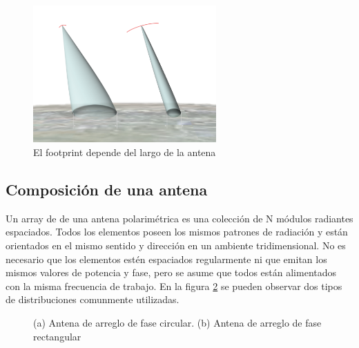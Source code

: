 \begin{figure}[H]
 \centering
 \includegraphics[width=7cm]{gfx/footprint.png}
 \caption{El footprint depende del largo de la antena}
 \label{fig:footprint}
\end{figure}

\subsection{Composición de una antena}

Un array de de una antena polarimétrica es una colección de N módulos radiantes espaciados. Todos los elementos poseen los
mismos patrones de radiación y están orientados en el mismo sentido y dirección en un ambiente tridimensional. No es 
necesario que los elementos estén espaciados regularmente ni que emitan los mismos valores de potencia y fase, pero se asume 
que todos están alimentados con la misma frecuencia de trabajo. En la figura \ref{fig:phasedArrayAntenna} se pueden observar
dos tipos de distribuciones comunmente utilizadas.

\begin{figure}[H]
	\centering
	\caption{ (a) Antena de arreglo de fase circular. (b) Antena de arreglo de fase rectangular}
	\label{fig:phasedArrayAntenna}
\end{figure}

